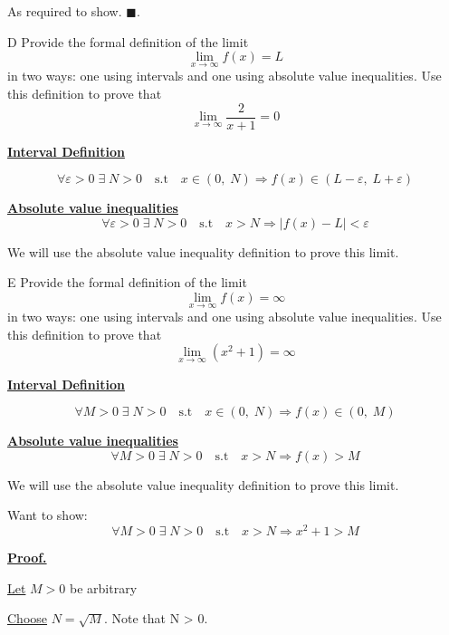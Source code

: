 \documentclass[]{article}
\begin{document}
As required to show. $\blacksquare$.
\begin{question}{D}
    Provide the formal definition of the limit
    \[
    \lim_{x \to \infty} f(x) = L
    \]
    in two ways: one using intervals and one using absolute value inequalities. Use this definition to prove that
    \[
    \lim_{x \to \infty} \frac{2}{x+1} = 0
    \]
\end{question}

\underline{\bf{Interval Definition}}

\[
    \forall \varepsilon> 0 \;\exists\;N > 0 \quad \text{s.t} \quad x \in(0, \;N) \Longrightarrow f(x) \in (L -\varepsilon, \;L+\varepsilon)
\]

\underline{\bf{Absolute value inequalities}}
\[
    \forall \varepsilon > 0\;\exists\; N>0 \quad \text{s.t} \quad 
    x > N \Longrightarrow |f(x) - L| < \varepsilon
\]

\hline
\vspace{0.1in}
We will use the absolute value inequality definition to prove this limit.

\begin{question}{E}
    Provide the formal definition of the limit
    \[
    \lim_{x \to \infty} f(x) = \infty
    \]
    in two ways: one using intervals and one using absolute value inequalities. Use this definition to prove that
    \[
    \lim_{x \to \infty} (x^2+1) = \infty
    \]
\end{question}

\underline{\bf{Interval Definition}}

\[
    \forall M > 0 \;\exists\;N > 0 \quad \text{s.t} \quad x \in(0, \;N) \Longrightarrow f(x) \in (0, \;M)
\]

\underline{\bf{Absolute value inequalities}}
\[
    \forall M > 0\;\exists\; N>0 \quad \text{s.t} \quad 
    x > N \Longrightarrow f(x) > M
\]

\hline
\vspace{0.1in}
We will use the absolute value inequality definition to prove this limit.

Want to show: 
\[
    \forall M > 0\;\exists\; N >0 \quad \text{s.t} \quad 
    x > N \Longrightarrow x^2+1 > M
\]

\underline{\bf{Proof.}}

\underline{Let} $M > 0$ be arbitrary

\medbreak

\underline{Choose} $N = \sqrt{M} $. Note that N > 0.

\medbreak
\end{document}

